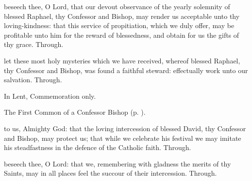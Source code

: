 
\secret
{} beseech thee, O Lord, that our devout observance of the yearly solemnity of blessed Raphael, thy Confessor and Bishop, may render us acceptable unto thy loving-kindness: that this service of propitiation, which we duly offer, may be profitable unto him for the reward of blessedness, and obtain for us the gifts of thy grace. Through.


\postcommunion
{} let these most holy mysteries which we have received, whereof blessed Raphael, thy Confessor and Bishop, was found a faithful steward: effectually work unto our salvation. Through.


\clearpage
{}

\begin{rubric}
	In Lent, Commemoration only.
\end{rubric}

\begin{rubric}
	The First Common of a Confessor Bishop (p. \pageref{CommonConfessorBishopI}).
\end{rubric}

\vspace{-0.5\baselineskip}

\collect

\vspace{-0.16\baselineskip}

 to us, Almighty God: that the loving intercession of blessed David, thy Confessor and Bishop, may protect us; that while we celebrate his festival we may imitate his steadfastness in the defence of the Catholic faith. Through.

\vspace{-0.5\baselineskip}

\secret

\vspace{-0.17\baselineskip}

 beseech thee, O Lord: that we, remembering with gladness the merits of thy Saints, may in all places feel the succour of their intercession. Through.

